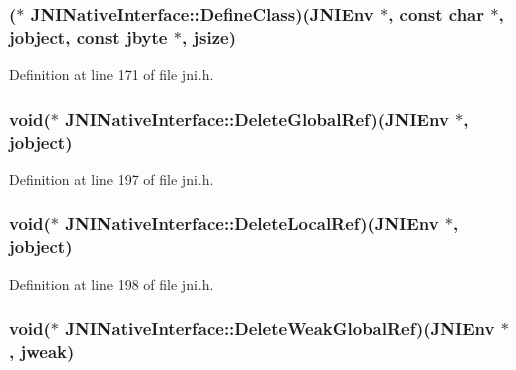 \hypertarget{struct_j_n_i_native_interface_a854af1c87b4b1e6e63ec4d6ad7c9feba}{
\subsubsection[{Define\-Class}]{($\ast$ J\-N\-I\-Native\-Interface\-::\-Define\-Class)({\bf J\-N\-I\-Env} $\ast$, const char $\ast$, {\bf jobject}, const {\bf jbyte} $\ast$, {\bf jsize})}}\label{struct_j_n_i_native_interface_a854af1c87b4b1e6e63ec4d6ad7c9feba}


Definition at line 171 of file jni.\-h.

\hypertarget{struct_j_n_i_native_interface_a9f0cc55e476e85ec1a539fc294895e72}{
\subsubsection[{Delete\-Global\-Ref}]{\setlength{\rightskip}{0pt plus 5cm}void($\ast$ J\-N\-I\-Native\-Interface\-::\-Delete\-Global\-Ref)({\bf J\-N\-I\-Env} $\ast$, {\bf jobject})}}\label{struct_j_n_i_native_interface_a9f0cc55e476e85ec1a539fc294895e72}


Definition at line 197 of file jni.\-h.

\hypertarget{struct_j_n_i_native_interface_a801a71ae8facc89a23bdbe9daf7e5b2a}{
\subsubsection[{Delete\-Local\-Ref}]{\setlength{\rightskip}{0pt plus 5cm}void($\ast$ J\-N\-I\-Native\-Interface\-::\-Delete\-Local\-Ref)({\bf J\-N\-I\-Env} $\ast$, {\bf jobject})}}\label{struct_j_n_i_native_interface_a801a71ae8facc89a23bdbe9daf7e5b2a}


Definition at line 198 of file jni.\-h.

\hypertarget{struct_j_n_i_native_interface_a6077c10efd1fd241ed989d496d50cdfe}{
\subsubsection[{Delete\-Weak\-Global\-Ref}]{\setlength{\rightskip}{0pt plus 5cm}void($\ast$ J\-N\-I\-Native\-Interface\-::\-Delete\-Weak\-Global\-Ref)({\bf J\-N\-I\-Env} $\ast$, {\bf jweak})}}\label{struct_j_n_i_native_interface_a6077c10efd1fd241ed989d496d50cdfe}


